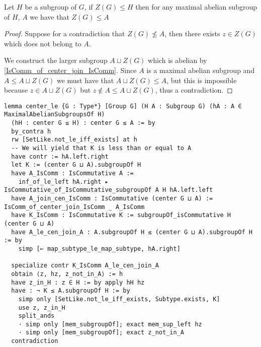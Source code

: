 \begin{lemma}
  \label{MaximalAbelianSubgroup.center_le}
  Let $H$ be a subgroup of $G$, if $Z(G) \le H$ then for any maximal abelian subgroup of $H$, $A$ we have that $Z(G) \le A$ 
  \leanok
\end{lemma}
\begin{proof}
  \leanok

  Suppose for a contradiction that $Z(G) \not\le A$, then there exists $z \in Z(G)$ which does not belong to $A$.

  We construct the larger subgroup $A \sqcup Z(G)$ which is abelian by \ref{IsComm_of_center_join_IsComm}. Since 
  $A$ is a maximal abelian subgroup and $A \le A \sqcup Z(G)$ we must have that $A \sqcup Z(G) \le A$, but this is impossible 
  because $z \in A \sqcup Z(G)$ but $z \notin A \le A \sqcup Z(G)$, thus a contradiction.
\end{proof}
\begin{footnotesize}
\begin{verbatim}
lemma center_le {G : Type*} [Group G] (H A : Subgroup G) (hA : A ∈ MaximalAbelianSubgroupsOf H)
  (hH : center G ≤ H) : center G ≤ A := by
  by_contra h
  rw [SetLike.not_le_iff_exists] at h
  -- We will yield that K is less than or equal to A
  have contr := hA.left.right
  let K := (center G ⊔ A).subgroupOf H
  have A_IsComm : IsCommutative A :=
    inf_of_le_left hA.right ▸ IsCommutative_of_IsCommutative_subgroupOf A H hA.left.left
  have A_join_cen_IsComm : IsCommutative (center G ⊔ A) := IsComm_of_center_join_IsComm _ A_IsComm
  have K_IsComm : IsCommutative K := subgroupOf_isCommutative H (center G ⊔ A)
  have A_le_cen_join_A : A.subgroupOf H ≤ (center G ⊔ A).subgroupOf H := by
    simp [← map_subtype_le_map_subtype, hA.right]

  specialize contr K_IsComm A_le_cen_join_A
  obtain ⟨z, hz, z_not_in_A⟩ := h
  have z_in_H : z ∈ H := by apply hH hz
  have : ¬ K ≤ A.subgroupOf H := by
    simp only [SetLike.not_le_iff_exists, Subtype.exists, K]
    use z, z_in_H
    split_ands
    · simp only [mem_subgroupOf]; exact mem_sup_left hz
    · simp only [mem_subgroupOf]; exact z_not_in_A
  contradiction
\end{verbatim}
\end{footnotesize}

